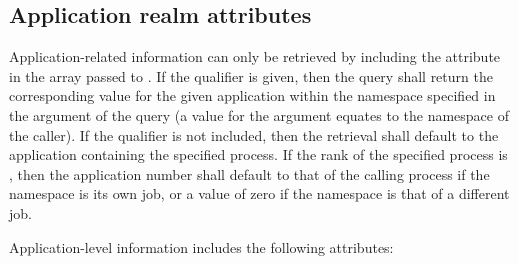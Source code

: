 %
%


\subsection{Application realm attributes}
\label{chap:api_rsvd_keys:aprealm}

Application-related information can only be retrieved by including the
 attribute in the  array passed to
. If the  qualifier is given, then the
query shall return the corresponding value for the given application within the
namespace specified in the  argument of the query (a 
value for the  argument equates to the namespace of the caller).
If the  qualifier is not included, then the retrieval
shall default to the application containing the specified process. If the rank
of the specified process is ,
then the application number shall default to that of the calling process if the
namespace is its own job, or a value of zero if the namespace is that of a
different job.

Application-level information includes the following attributes:

